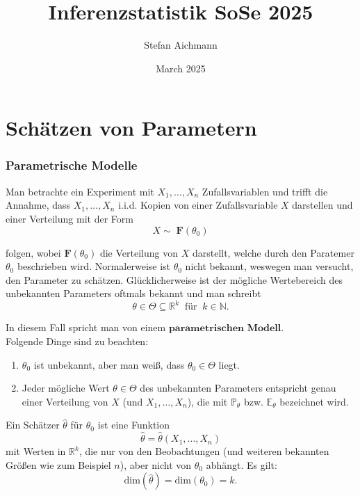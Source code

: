 \documentclass[10pt]{article}
\title{Inferenzstatistik SoSe 2025}
\author{Stefan Aichmann}
\date{March 2025}
\newcommand{\FZV}{X_1, \ldots, X_n} %
\newcommand{\IR}{\mathbb{R}} %
\begin{document}
	
	\maketitle \newpage
	\tableofcontents \newpage
	
	\part{Schätzen von Parametern}
	
	\section{Parametrische Modelle}
	Man betrachte ein Experiment mit $\FZV$ Zufallsvariablen und trifft die Annahme, dass $\FZV$ i.i.d. Kopien von einer Zufallsvariable $X$ darstellen und einer Verteilung mit der Form
	\begin{equation*}
	 X \sim \; \textbf{F}(\theta_0)
	\end{equation*}
	
	\noindent folgen, wobei $\textbf{F}(\theta_0)$ die Verteilung von $X$ darstellt, welche durch den Paratemer $\theta_0$ beschrieben wird. Normalerweise ist $\theta_0$ nicht bekannt, weswegen  man versucht, den Parameter zu schätzen. Glücklicherweise ist der mögliche Wertebereich des unbekannten Parameters oftmals bekannt und man schreibt
	\begin{equation*}
		\theta \in \Theta \subseteq \IR^k \;\; \text{für} \;\; k \in \mathbb{N}.
	\end{equation*}
	
	\noindent In diesem Fall spricht man von einem $\textbf{parametrischen Modell}$.\\
	Folgende Dinge sind zu beachten: 
	
	\begin{enumerate}
      \item $\theta_0$ ist unbekannt, aber man weiß, dass $\theta_0 \in \Theta$ liegt. 
      \item  Jeder mögliche Wert $\theta \in \Theta$ des unbekannten Parameters entspricht genau einer Verteilung von $X$ (und $\FZV$), die mit $\mathbb{P}_\theta$ bzw. $\mathbb{E}_\theta$ bezeichnet wird.
	\end{enumerate}
	
	
	\begin{Definition}
		Ein Schätzer $\hat{\theta}$ für $\theta_0$ ist eine Funktion 
		\begin{equation*}
				\hat{\theta} = \hat{\theta} (\FZV)
		\end{equation*}
	 mit Werten in $\IR ^k$, die nur von den Beobachtungen (und weiteren bekannten Größen wie zum Beispiel $n$), aber nicht von $\theta_0$ abhängt.
	 Es gilt:
	 \begin{equation*}
	 	\text{dim}(\hat{\theta}) = \text{dim}(\theta_0) = k.
	 \end{equation*}
	\end{Definition}
	 
\end{document}
